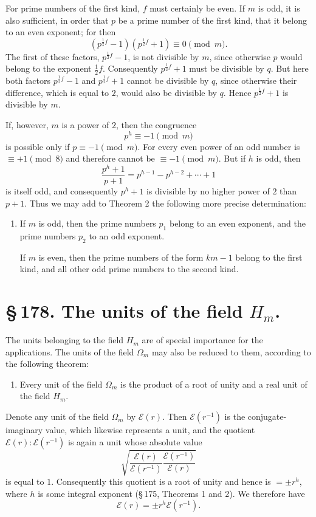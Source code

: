 \documentclass[11pt]{article}
\begin{document}
For prime numbers of the first kind, $f$ must certainly be even. If $m$ is odd, it is also sufficient, in order that $p$ be a prime number of the first kind, that it belong to an even exponent; for then
\[
(p^{\frac12 f}-1)(p^{\frac12 f}+1)\equiv0\pmod m.
\]
The first of these factors, $p^{\frac12 f}-1$, is not divisible by $m$, since otherwise $p$ would belong to the exponent $\frac12f$. Consequently $p^{\frac12 f}+1$ must be divisible by $q$. But here both factors $p^{\frac12 f}-1$ and $p^{\frac12 f}+1$ cannot be divisible by $q$, since otherwise their difference, which is equal to $2$, would also be divisible by $q$. Hence $p^{\frac12 f}+1$ is divisible by $m$.

If, however, $m$ is a power of $2$, then the congruence
\[
p^h\equiv -1\pmod m
\]
is possible only if $p\equiv -1\pmod m$. For every even power of an odd number is $\equiv+1\pmod 8$ and therefore cannot be $\equiv-1\pmod m$. But if $h$ is odd, then
\[
\frac{p^h+1}{p+1}=p^{h-1}-p^{h-2}+\cdots+1
\]
is itself odd, and consequently $p^h+1$ is divisible by no higher power of $2$ than $p+1$. Thus we may add to Theorem 2 the following more precise determination:

\begin{enumerate}[label=\arabic*.,leftmargin=2.2em,start=3]
\item If $m$ is odd, then the prime numbers $p_1$ belong to an even exponent, and the prime numbers $p_2$ to an odd exponent.

If $m$ is even, then the prime numbers of the form $km-1$ belong to the first kind, and all other odd prime numbers to the second kind.
\end{enumerate}

\section*{\S\,178. The units of the field $H_m$.}

The units belonging to the field $H_m$ are of special importance for the applications. The units of the field $\Omega_m$ may also be reduced to them, according to the following theorem:

\begin{enumerate}[label=\arabic*.,leftmargin=2.2em]
\item Every unit of the field $\Omega_m$ is the product of a root of unity and a real unit of the field $H_m$.
\end{enumerate}

Denote any unit of the field $\Omega_m$ by $\mathscr E(r)$. Then $\mathscr E(r^{-1})$ is the conjugate-imaginary value, which likewise represents a unit, and the quotient $\mathscr E(r):\mathscr E(r^{-1})$ is again a unit whose absolute value
\begin{equation}
\sqrt{\frac{\mathscr E(r)}{\mathscr E(r^{-1})}\frac{\mathscr E(r^{-1})}{\mathscr E(r)}}
\tag{1}
\end{equation}
is equal to $1$. Consequently this quotient is a root of unity and hence is $=\pm r^h$, where $h$ is some integral exponent (\S\,175, Theorems 1 and 2). We therefore have
\begin{equation}
\mathscr E(r)=\pm r^h\mathscr E(r^{-1}).
\tag{2}
\end{equation}
\end{document}
